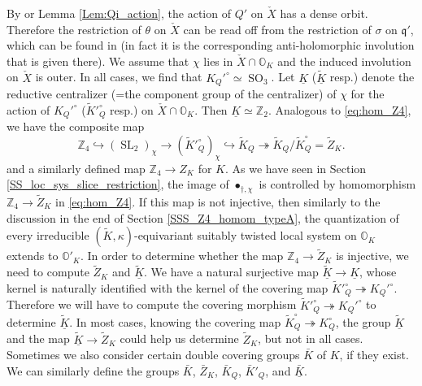 \documentclass[12pt]{amsart}
\newcommand{\Orb}{\mathbb{O}}
\newcommand{\Z}{\mathbb{Z}}
\newcommand{\q}{\mathfrak{q}}
\newcommand{\SL}{\operatorname{SL}}
\newcommand{\SO}{\operatorname{SO}}
\theoremstyle{definition}
\numberwithin{equation}{section}
\begin{document}
By \cite[Proposition 3.3]{FJLS1} or Lemma \ref{Lem:Qi_action}, the action of $Q'$ on $\check{X}$ has a dense orbit. Therefore the restriction of $\theta$ on $\check{X}$ can be read off from the restriction of $\sigma$ on $\q'$, which can be found in \cite{Dk0} (in fact it is the corresponding anti-holomorphic involution that is given there). We assume that $\chi$ lies in $\check{X} \cap \Orb_K$ and the induced involution on $\check{X}$ is outer.  In all cases, we find that $K_Q'^\circ \simeq \SO_3$. Let $\underline{K}$ ($\underline{\tilde{K}}$ resp.) denote the reductive centralizer (=the component group of the centralizer) of $\chi$ for the action of $K_Q'^\circ$ ($\tilde{K}'^\circ_Q$ resp.) on $\check{X}\cap \Orb_K$. Then $\underline{K} \simeq \Z_2$. Analogous to \eqref{eq:hom_Z4}, we have the composite map
  \[  \Z_4\hookrightarrow (\SL_2)_\chi \rightarrow (\tilde{K}'^\circ_{Q})_\chi \hookrightarrow \tilde{K}_Q\twoheadrightarrow \tilde{K}_Q / \tilde{K}_Q^\circ = \tilde{Z}_K.\]
and a similarly defined map $\Z_4 \to Z_K$ for $K$. As we have seen in Section \ref{SS_loc_sys_slice_restriction}, the image of $\bullet_{\dagger,\chi}$ is controlled by homomorphism $\Z_4 \rightarrow \tilde{Z}_K$ in \eqref{eq:hom_Z4}. If this map is not injective, then similarly to the discussion in the end of Section \ref{SSS_Z4_homom_typeA}, the quantization of every irreducible $(\tilde{K},\kappa)$-equivariant
suitably  twisted local system on $\Orb_K$ extends to $\Orb'_K$. In order to determine whether the map $\Z_4 \to \tilde{Z}_K$ is injective, we need to compute $\tilde{Z}_K$ and $\underline{\tilde{K}}$. We have a natural surjective map $\underline{\tilde{K}} \to \underline{K}$, whose kernel is naturally identified with the kernel of the covering map $\tilde{K}'^\circ_Q \twoheadrightarrow K_Q'^\circ$. Therefore we will have to compute the covering morphism $\tilde{K}'^\circ_Q \twoheadrightarrow K_Q'^\circ$ to determine $\underline{\tilde{K}}$. In most cases, knowing the covering map $\tilde{K}_Q^\circ \twoheadrightarrow K_Q^\circ$, the group $\underline{\tilde{K}}$ and the map $\underline{\tilde{K}} \to \tilde{Z}_K$ could help us determine $\tilde{Z}_K$, but not in all cases. %
Sometimes we also consider certain double covering groups $\bar{K}$ of $K$, if they exist. We can similarly define the groups $\bar{K}$, $\bar{Z}_K$, $\bar{K}_Q$, $\bar{K}'_Q$, and $\underline{\bar{K}}$.
\end{document}
